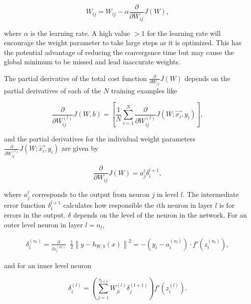 \documentclass[10pt]{article}
\begin{document}
\begin{equation}
W_{ij} = W_{ij} - \alpha \frac{\partial}{\partial W_{ij}} J\left( W \right),
\label{eq_adjust_w}
\end{equation}



\noindent where $\alpha$ is the learning rate. A high value $>1$ for the learning rate will encourage the weight parameter to take large steps as it is optimized. This has the potential advantage of reducing the convergence time but may cause the global minimum to be missed and lead inaccurate weights.

The partial derivative of the total cost function $\frac{\partial}{\partial W_{ij}} J\left( W \right)$ depends on the partial derivatives of each of the $N$ training examples like 

\begin{equation}
\frac{\partial}{\partial W_{ij}^{(l)}} J(W,b) = \left[ \frac{1}{N} \sum_{i=1}^N \frac{\partial}{\partial W_{ij}^{(l)}} J(W; \vec{x_i}, y_i) \right], 
\label{eq_partial_tot}
\end{equation}


\noindent and the partial derivatives for the individual weight parameters $\frac{\partial}{\partial W_{ij}^{(l)}} J(W; \vec{x_i}, y_i)$ are given by 



\begin{equation}
\frac{\partial}{\partial W_{ij}} J\left( W \right) = a_j^l \delta_i^{l+1},
\label{eq_partdiv}
\end{equation}

\noindent where $a_j^l$ corresponds to the output from neuron $j$ in level $l$. The intermediate error function $\delta_i^{l+1}$ calculates how responsible the $i$th neuron in layer $l$ is for errors in the output. $\delta$ depends on the level of the neuron in the network. For an outer level neuron in layer $l=n_l$,

\begin{align}
\delta^{(n_l)}_i
= \frac{\partial}{\partial z^{(n_l)}_i} \;\;
\frac{1}{2} \left\|y - h_{W,b}(x)\right\|^2 = - (y_i - a^{(n_l)}_i) \cdot f'(z^{(n_l)}_i),
\label{eq_delta}
\end{align}


\noindent and for an inner level neuron

\begin{equation}
\delta^{(l)}_i = \left( \sum_{j=1}^{s_{l+1}} W^{(l)}_{ji} \delta^{(l+1)}_j \right) f'(z^{(l)}_i).
\label{eq_delta_in}
\end{equation}
\end{document}
